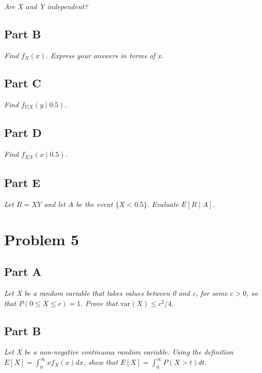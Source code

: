 \documentclass{article}
\begin{document}
\textit{Are X and Y independent?}

\subsection*{Part B}

\textit{Find $ f_X(x) $. Express your answers in terms of x.}

\subsection*{Part C}

\textit{Find $ f_{Y|X}(y \mid 0.5) $.}

\subsection*{Part D}

\textit{Find $ f_{X|Y}(x \mid 0.5) $.}

\subsection*{Part E}

\textit{Let $ R = XY $ and let $A$ be the event $ \{ X < 0.5 \} $. Evaluate $
E[R \mid A] $.}

\section*{Problem 5}

\subsection*{Part A}

\textit{Let X be a random variable that takes values between 0 and c, for
some $ c > 0 $, so that $P(0 \leq X \leq c) = 1$. Prove that $\mathrm{var}(X)
\leq c^2/4$.}

\subsection*{Part B}

\textit{Let X be a non-negative continuous random variable. Using the
definition $E[X] = \int_0^{\infty} x f_X(x) dx $, show that $ E[X] =
\int_0^{\infty} P(X > t) dt $.}
\end{document}
